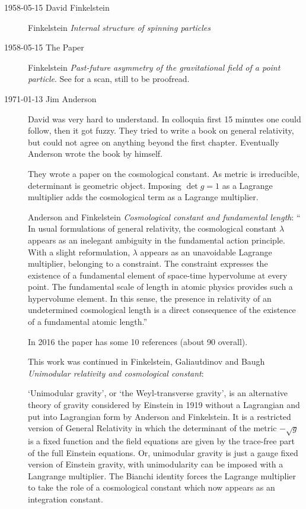 \begin{description}
\item[1958-05-15 David Finkelstein]

Finkelstein
{\em Internal structure of spinning particles}

\item[1958-05-15 The Paper]
Finkelstein
{\em Past-future asymmetry of the gravitational field of a point particle}.
See  for a scan, still to be proofread.

\item[1971-01-13 Jim Anderson] David was very hard to understand. In
colloquia first 15 minutes one could follow, then it got fuzzy. They
tried to write a book on general relativity, but could not agree on
anything beyond the first chapter. Eventually Anderson wrote the book by
himself.

They wrote a paper on the cosmological constant. As metric is irreducible,
determinant is geometric object. Imposing $\det g = 1$ as a Lagrange
multiplier adds the cosmological term as a Lagrange multiplier.

Anderson and Finkelstein
{\em Cosmological constant and fundamental length}: ``
In usual formulations of general relativity, the cosmological constant
$\lambda$
appears as an inelegant ambiguity in the fundamental action principle.
With a slight reformulation, $\lambda$ appears as an unavoidable Lagrange
multiplier, belonging to a constraint. The constraint expresses the
existence of a fundamental element of space-time hypervolume at every
point. The fundamental scale of length in atomic physics provides such a
hypervolume element. In this sense, the presence in relativity of an
undetermined cosmological length is a direct consequence of the existence
of a fundamental atomic length.''

In 2016 the paper has some 10 references (about 90 overall).

This work was continued in
Finkelstein, Galiautdinov and Baugh
{\em Unimodular relativity and cosmological constant}:

`Unimodular gravity', or `the Weyl-transverse gravity', is an alternative
theory of gravity considered by Einstein in 1919 without a Lagrangian and
put into Lagrangian form by Anderson and Finkelstein. It is
a restricted version of General Relativity in which the determinant of
the metric $-\sqrt{g}$ is a fixed function and the field equations are
given by the trace-free part of the full Einstein equations. Or,
unimodular gravity is just a gauge  fixed version of Einstein gravity,
with unimodularity can be imposed with a Langrange multiplier.  The
Bianchi identity forces the Lagrange multiplier to take the role of a
cosmological constant which now appears as an integration constant.



\end{description}
